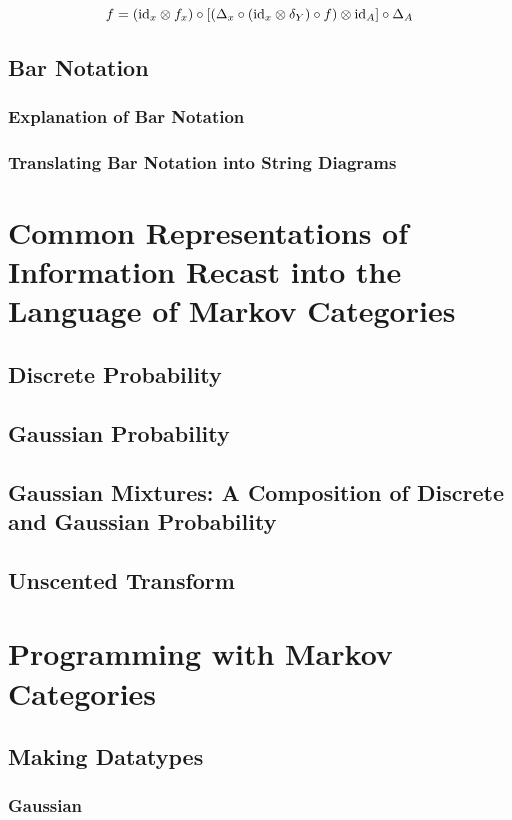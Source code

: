\begin{equation}
\label{eq:conditional-parallel-compositions}
f = (\mathrm{id}_x \otimes f_x) \circ \left[\left(\Delta_x \circ (\mathrm{id}_x\otimes \delta_Y) \circ f\right) \otimes \mathrm{id}_A\right] \circ \Delta_A
\end{equation}

\section{Bar Notation}
\subsection{Explanation of Bar Notation}
\subsection{Translating Bar Notation into String Diagrams}

\chapter{Common Representations of Information Recast into the Language of Markov Categories}
\section{Discrete Probability}
\section{Gaussian Probability}
\section{Gaussian Mixtures: A Composition of Discrete and Gaussian Probability}
\section{Unscented Transform}

\chapter{Programming with Markov Categories}
\section{Making Datatypes}
\subsection{Gaussian}
